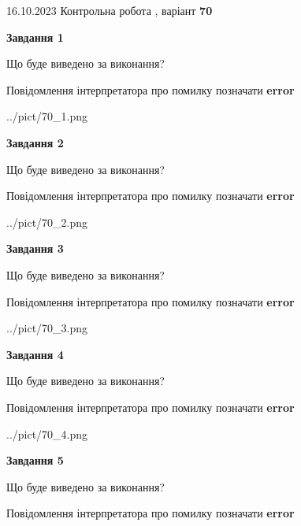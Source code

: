 \documentclass[12pt, ukrainian]{article}
\begin{document}
{\Large{16.10.2023 Контрольна робота , варіант  \No \textbf { 70 }\par}}
{
\begin {large}
{\begin {center}\textbf{Завдання 1}\end {center}}\par
Що буде виведено за виконання? \par
Повідомлення інтерпретатора про помилку позначати \textbf{error}

\begin{center}
	{../pict/70_1.png}
\end{center}
\newpage

{\begin {center}\textbf{Завдання 2}\end {center}}\par
Що буде виведено за виконання? \par
Повідомлення інтерпретатора про помилку позначати \textbf{error}

\begin{center}
	{../pict/70_2.png}
\end{center}
\newpage

{\begin {center}\textbf{Завдання 3}\end {center}}\par
Що буде виведено за виконання? \par
Повідомлення інтерпретатора про помилку позначати \textbf{error}

\begin{center}
	{../pict/70_3.png}
\end{center}
\newpage

{\begin {center}\textbf{Завдання 4}\end {center}}\par
Що буде виведено за виконання? \par
Повідомлення інтерпретатора про помилку позначати \textbf{error}

\begin{center}
	{../pict/70_4.png}
\end{center}
\newpage

{\begin {center}\textbf{Завдання 5}\end {center}}\par
Що буде виведено за виконання? \par
Повідомлення інтерпретатора про помилку позначати \textbf{error}


\end{large}}
\end{document}

